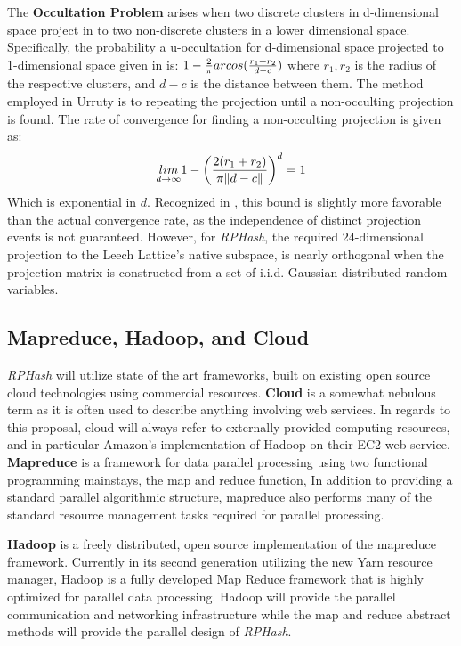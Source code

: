 \documentclass[a4paper,10pt]{article}
\begin{document}
The \textbf{Occultation Problem} arises when two discrete clusters in
d-dimensional space project in to two non-discrete clusters in a lower
dimensional space.  Specifically, the probability a u-occultation for
d-dimensional space projected to 1-dimensional space given in \cite{Urruty2007}
is: $1-{2 \over \pi} arcos({{r_1+r_2}\over{d-c}}) $ where $r_1,r_2$ is the
radius of the respective clusters, and $d-c$ is the distance between them.
The method employed in Urruty\cite{Urruty2007} is to repeating the projection
until a non-occulting projection is found.  The rate of convergence for
finding a non-occulting projection is given as: $$\underset {d\rightarrow
\infty}{lim}1-\bigg({{2(r_1+r_2)}\over {\pi \|d-c\|}}\bigg)^d = 1$$ Which is
exponential in $d$.  Recognized in \cite{Urruty2007}, this bound is slightly
more favorable than the actual convergence rate, as the independence of
distinct projection events is not guaranteed.  However, for \emph{RPHash},
the required 24-dimensional projection to the Leech Lattice's native subspace,
is nearly orthogonal when the projection matrix is constructed from a set
of i.i.d.  Gaussian distributed random variables\cite{vempala}.


\subsection{Mapreduce, Hadoop, and Cloud}
 \emph{RPHash} will utilize state of the art frameworks, built on existing
 open source cloud technologies using commercial resources.
\textbf{Cloud} is a somewhat nebulous term as it is often used to describe
anything involving web services.  In regards to this proposal, cloud will
always refer to externally provided computing resources, and in particular
Amazon's implementation of Hadoop on their EC2 web service.  \textbf{Mapreduce}
is a framework for data parallel processing using two functional programming
mainstays, the map and reduce function, In addition to providing a standard
parallel algorithmic structure, mapreduce also performs many of the standard
resource management tasks required for parallel processing.

\textbf{Hadoop} is a freely distributed, open source implementation of the
mapreduce framework.  Currently in its second generation utilizing the new
Yarn resource manager, Hadoop is a fully developed Map Reduce framework
that is highly optimized for parallel data processing.  Hadoop will provide the
parallel communication and networking infrastructure while the map and reduce
abstract methods will provide the parallel design of \emph{RPHash}.
\end{document}
